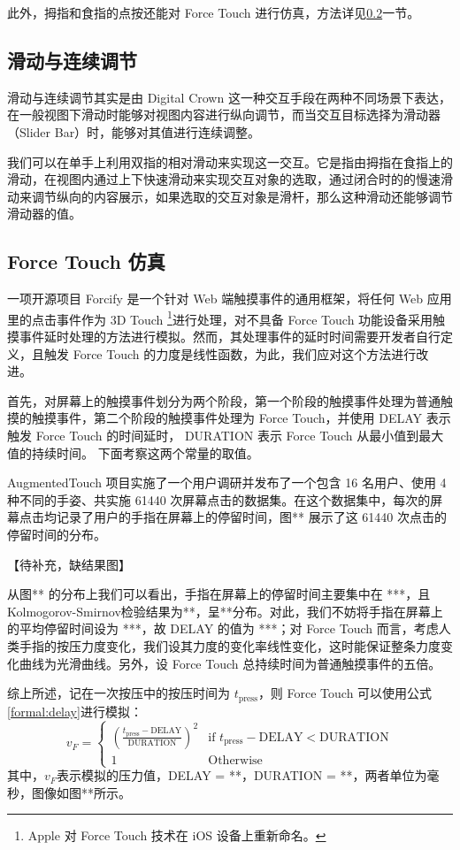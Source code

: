 此外，拇指和食指的点按还能对 Force Touch 进行仿真，方法详见\ref{sub:force-touch-simu}一节。

\subsection{滑动与连续调节}

滑动与连续调节其实是由 Digital Crown 这一种交互手段在两种不同场景下表达，在一般视图下滑动时能够对视图内容进行纵向调节，而当交互目标选择为滑动器（Slider Bar）时，能够对其值进行连续调整。

我们可以在单手上利用双指的相对滑动来实现这一交互。它是指由拇指在食指上的滑动，在视图内通过上下快速滑动来实现交互对象的选取，通过闭合时的的慢速滑动来调节纵向的内容展示，如果选取的交互对象是滑杆，那么这种滑动还能够调节滑动器的值。

\subsection{Force Touch 仿真}
\label{sub:force-touch-simu}

一项开源项目 Forcify \cite{Huxpro:2016ua} 是一个针对 Web 端触摸事件的通用框架，将任何 Web 应用里的点击事件作为 3D Touch \footnote{Apple 对 Force Touch 技术在 iOS 设备上重新命名。}进行处理，对不具备 Force Touch 功能设备采用触摸事件延时处理的方法进行模拟。然而，其处理事件的延时时间需要开发者自行定义，且触发 Force Touch 的力度是线性函数，为此，我们应对这个方法进行改进。

首先，对屏幕上的触摸事件划分为两个阶段，第一个阶段的触摸事件处理为普通触摸的触摸事件，第二个阶段的触摸事件处理为 Force Touch，并使用 DELAY 表示触发 Force Touch 的时间延时，
DURATION 表示 Force Touch 从最小值到最大值的持续时间。
下面考察这两个常量的取值。

AugmentedTouch \cite{Changkun:2016} 项目实施了一个用户调研并发布了一个包含 16 名用户、使用 4 种不同的手姿、共实施 61440 次屏幕点击的数据集。在这个数据集中，每次的屏幕点击均记录了用户的手指在屏幕上的停留时间，图** 展示了这 61440 次点击的停留时间的分布。

【待补充，缺结果图】

从图** 的分布上我们可以看出，手指在屏幕上的停留时间主要集中在 ***，且Kolmogorov-Smirnov检验结果为**，呈**分布。对此，我们不妨将手指在屏幕上的平均停留时间设为 ***，故 DELAY 的值为 ***；对 Force Touch 而言，考虑人类手指的按压力度变化，我们设其力度的变化率线性变化，这时能保证整条力度变化曲线为光滑曲线。另外，设 Force Touch 总持续时间为普通触摸事件的五倍。

综上所述，记在一次按压中的按压时间为 $t_{\text{press}}$，则 Force Touch 可以使用公式\ref{formal:delay}进行模拟：
\begin{equation}
v_{F} =
    \begin{cases}
        \left(\frac{t_{\text{press}}-\text{DELAY}}{\text{DURATION}}\right)^{2}
             & \mbox{if $t_{\text{press}}-\text{DELAY}< \text{DURATION}$} \\
        1    & \mbox{Otherwise}
    \end{cases}
\label{formal:delay}
\end{equation}
其中，$v_{F}$表示模拟的压力值，DELAY = **，DURATION = **，两者单位为毫秒，图像如图**所示。

